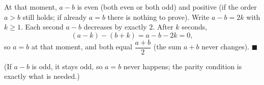 At that moment, $a-b$ is even (both even or both odd) and positive (if the order $a>b$ still holds; if already $a=b$ there is nothing to prove). Write $a-b=2k$ with $k\ge1$. Each second $a-b$ decreases by exactly $2$. After $k$ seconds,
\[
(a-k)-(b+k)=a-b-2k=0,
\]
so $a=b$ at that moment, and both equal $\dfrac{a+b}{2}$ (the sum $a+b$ never changes). $\blacksquare$

(If $a-b$ is odd, it stays odd, so $a=b$ never happens; the parity condition is exactly what is needed.)
